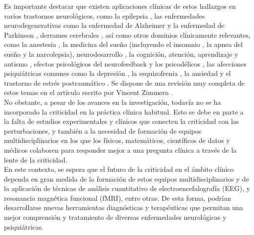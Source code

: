 Es importante destacar que existen aplicaciones clínicas de estos hallazgos en varios trastornos neurológicos, como la epilepsia \cite{osorio_epileptic_2010,witton_rogue_2019,kramer_human_2012,moosavi_criticality_2023,meisel_antiepileptic_2020}, las enfermedades neurodegenerativas como la enfermedad de Alzheimer \cite{stam_disturbed_2005,montez_altered_2009,vysata_change_2014} y la enfermedad de Parkinson \cite{hohlefeld_long-range_2012,herrojo_ruiz_long-range_2014,west_parkinsonian_2016}, derrames cerebrales \cite{rocha_recovery_2022}, así como otros dominios clínicamente relevantes, como la anestesia \cite{alonso_dynamical_2014,thiery_long-range_2018,liu_scale-free_2014}, la medicina del sueño \cite{bocaccio_avalanche-like_2019} (incluyendo el insomnio \cite{meisel_decline_2017,colombo_more_2016}, la apnea del sueño \cite{lo_asymmetry_2013} y la narcolepsia), neurodesarrollo \cite{padilla_breakdown_2020,smit_scale-free_2011,mares_age-dependent_2013}, la cognición, atención, aprendizaje y autismo \cite{ezaki_closer_2020,jia_attenuation_2018,ouyang_decomposing_2020,tinker_power_2014,dimitriadis_altered_2013}, efectos psicológicos del neurofeedback y los psicodélicos \cite{zhigalov_modulation_2016,tagliazucchi_enhanced_2014}, las afecciones psiquiátricas comunes como la depresión \cite{gartner_aberrant_2017}, la esquizofrenia \cite{moran_long-range_2019}, la ansiedad \cite{tolkunov_power_2010} y el trastorno de estrés postraumático \cite{ros_tuning_2014}.  Se dispone de una revisión muy completa de estos temas en el artículo escrito por Vincent Zimmern \cite{zimmern_why_2020}.\\

No obstante, a pesar de los avances en la investigación, todavía no se ha incorporado la criticidad en la práctica clínica habitual. Esto se debe en parte a la falta de estudios experimentales y clínicos que conecten la criticidad con las perturbaciones, y también a la necesidad de formación de equipos multidisciplinarios en los que los físicos, matemáticos, científicos de datos y médicos colaboren para responder mejor a una pregunta clínica a través de la lente de la criticidad.\\

En este contexto, se espera que el futuro de la criticidad en el ámbito clínico dependa en gran medida de la formación de estos equipos multidisciplinarios y de la aplicación de técnicas de análisis cuantitativo de electroencefalografía (\gls{EEG}),  y resonancia magnética funcional (\gls{fMRI}), entre otras. De esta forma, podrían desarrollarse nuevas herramientas diagnósticas y terapéuticas que permitan una mejor comprensión y tratamiento de diversas enfermedades neurológicas y psiquiátricas.



